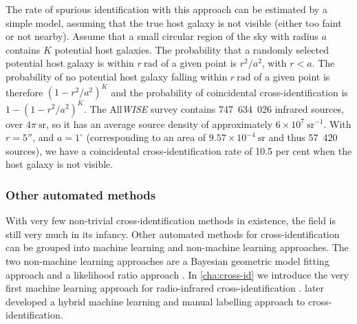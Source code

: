 \documentclass[11pt, a4paper]{book}
\begin{document}
            The rate of spurious identification with this approach can be estimated by a simple model, assuming that the true host galaxy is not visible (either too faint or not nearby). Assume that a small circular region of the sky with radius $a$ contains $K$ potential host galaxies. The probability that a randomly selected potential host galaxy is within $r\ \mathrm{rad}$ of a given point is $r^2 / a^2$, with $r < a$. The probability of no potential host galaxy falling within $r\ \mathrm{rad}$ of a given point is therefore $(1 - r^2 / a^2)^K$ and the probability of coincidental cross-identification is $1 - (1 - r^2 / a^2)^K$. The All\emph{WISE} survey contains 747~634~026 infrared sources, over $4\pi\ \mathrm{sr}$, so it has an average source density of approximately $6 \times 10^7\ \mathrm{sr}^{-1}$. With $r = 5''$, and $a = 1^\circ$ (corresponding to an area of $9.57 \times 10^{-4}\ \mathrm{sr}$ and thus 57~420 sources), we have a coincidental cross-identification rate of 10.5 per cent when the host galaxy is not visible.


        \subsubsection{Other automated methods}
        \label{sec:xid-other}

            With very few non-trivial cross-identification methods in existence, the field is still very much in its infancy. Other automated methods for cross-identification can be grouped into machine learning and non-machine learning approaches. The two non-machine learning approaches are a Bayesian geometric model fitting approach \citep{fan15,fan_optimal_2020} and a likelihood ratio approach \citep{weston_astronomical_2020,weston18lrpy}. In \autoref{cha:cross-id} we introduce the very first machine learning approach for radio-infrared cross-identification \citep{alger18radio}. \citet{galvin_cataloguing_2020} later developed a hybrid machine learning and manual labelling approach to cross-identification.
\end{document}
